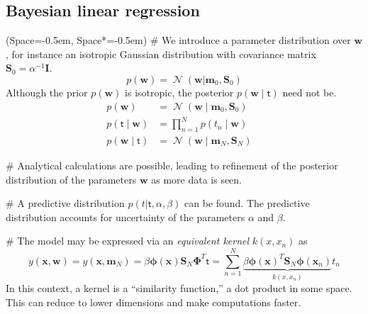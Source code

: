 \documentclass[12pt, a4paper]{article}
\newcommand{\listSpace}{-0.5em}%
\newcommand{\vect}[1]{\bm{#1}}
\DeclareMathOperator{\N}{\mathcal{N}}
\begin{document}
\subsection*{Bayesian linear regression}
\begin{easylist}[itemize]
	\ListProperties(Space=\listSpace, Space*=\listSpace)
	# We introduce a parameter distribution over $\vect{w}$, for instance an isotropic Gaussian distribution with covariance matrix $\vect{S}_0 = \alpha^{-1} \vect{I}$.
	\begin{equation*}
	p(\vect{w}) = \N (\vect{w} | \vect{m}_0, \vect{S}_0)
	\end{equation*}
	Although the prior $p(\vect{w})$ is isotropic, the posterior $p(\vect{w} \mid \mathsf{t})$ need not be.
	\begin{align*}
	    p(\vect{w}) &= \N ( \vect{w} \mid \vect{m}_0, \vect{S}_0) \quad \tag{prior} \\
	    p(\mathsf{t}\mid \vect{w}) &= \prod_{n=1}^{N} p(t_n \mid \vect{w}) \quad \tag{likelihood} \\
	    p(\vect{w} \mid \mathsf{t}) &= \N ( \vect{w} \mid \vect{m}_N, \vect{S}_N) \quad \tag{posterior} 
	\end{align*}
	
	# Analytical calculations are possible, leading to refinement of the posterior distribution of the parameters $\vect{w}$ as more data is seen.
	
	# A predictive distribution $p(t | \mathsf{t}, \alpha, \beta)$ can be found.
	The predictive distribution accounts for uncertainty of the parameters $\alpha$ and $\beta$.
	
	# The model may be expressed via an \emph{equivalent kernel} $k(x, x_n)$ as 
	\begin{equation*}
		y(\vect{x}, \vect{w}) =
		y(\vect{x}, \vect{m}_N) =
		\beta \vect{\phi} (\vect{x}) \vect{S}_N \vect{\Phi}^T \mathsf{t}
		=
		\sum_{n=1}^{N} \underbrace{
			\beta \vect{\phi} (\vect{x})^T \vect{S}_N \vect{\phi} (\vect{x}_n)
			}_{k(x, x_n)}
			t_n
	\end{equation*}
	In this context, a kernel is a ``similarity function,'' a dot product in some space.
	This can reduce to lower dimensions and make computations faster.
\end{easylist}
\end{document}
